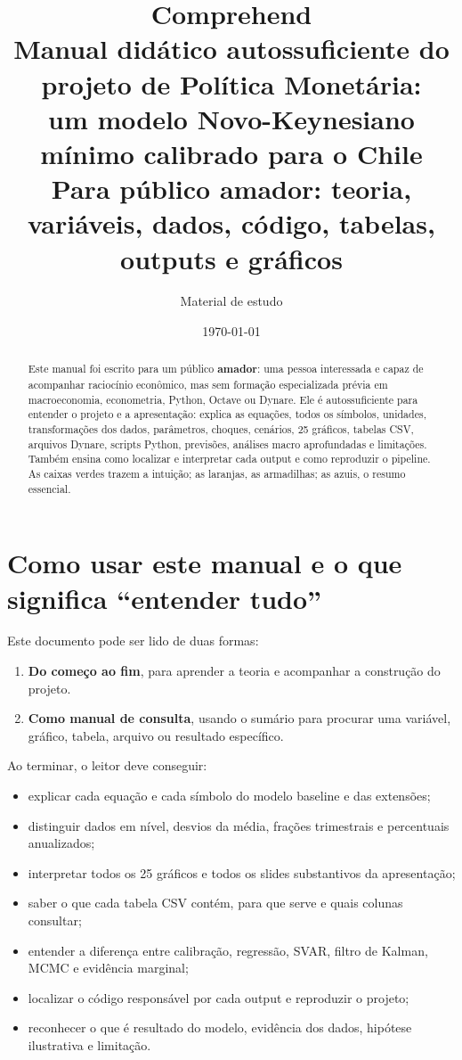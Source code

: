 \documentclass[11pt,a4paper]{article}
\title{\textbf{Comprehend}\\[2mm]
\large Manual didático autossuficiente do projeto de Política Monetária:\\
um modelo Novo-Keynesiano mínimo calibrado para o Chile\\[3mm]
\normalsize Para público amador: teoria, variáveis, dados, código, tabelas, outputs e gráficos}
\author{Material de estudo}
\date{\today}
\begin{document}
\maketitle
\begin{abstract}
\noindent Este manual foi escrito para um público \textbf{amador}: uma pessoa interessada e capaz de
acompanhar raciocínio econômico, mas sem formação especializada prévia em macroeconomia, econometria,
Python, Octave ou Dynare. Ele é autossuficiente para entender o projeto e a apresentação: explica as
equações, todos os símbolos, unidades, transformações dos dados, parâmetros, choques, cenários,
25 gráficos, tabelas CSV, arquivos Dynare, scripts Python, previsões, análises macro aprofundadas e
limitações. Também ensina como localizar e interpretar cada output e como reproduzir o pipeline.
As caixas verdes trazem a intuição; as laranjas, as armadilhas; as azuis, o resumo essencial.
\end{abstract}

\tableofcontents
\bigskip

\section{Como usar este manual e o que significa ``entender tudo''}

Este documento pode ser lido de duas formas:
\begin{enumerate}[nosep]
  \item \textbf{Do começo ao fim}, para aprender a teoria e acompanhar a construção do projeto.
  \item \textbf{Como manual de consulta}, usando o sumário para procurar uma variável, gráfico,
        tabela, arquivo ou resultado específico.
\end{enumerate}

Ao terminar, o leitor deve conseguir:
\begin{itemize}[nosep]
  \item explicar cada equação e cada símbolo do modelo baseline e das extensões;
  \item distinguir dados em nível, desvios da média, frações trimestrais e percentuais anualizados;
  \item interpretar todos os 25 gráficos e todos os slides substantivos da apresentação;
  \item saber o que cada tabela CSV contém, para que serve e quais colunas consultar;
  \item entender a diferença entre calibração, regressão, SVAR, filtro de Kalman, MCMC e evidência
        marginal;
  \item localizar o código responsável por cada output e reproduzir o projeto;
  \item reconhecer o que é resultado do modelo, evidência dos dados, hipótese ilustrativa e limitação.
\end{itemize}
\end{document}
